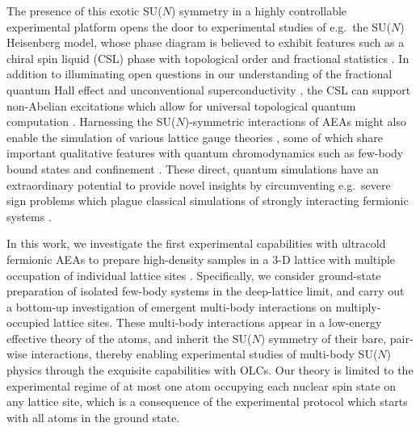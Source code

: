 \documentclass[preprint,showkeys,nofootinbib]{revtex4-1}
\newcommand{\1}{\mathds{1}}
\begin{document}
The presence of this exotic SU($N$) symmetry in a highly controllable
experimental platform opens the door to experimental studies of
e.g.~the SU($N$) Heisenberg model, whose phase diagram is believed to
exhibit features such as a chiral spin liquid (CSL) phase with
topological order and fractional statistics \cite{hermele2009mott,
  hermele2011topological, chen2016syntheticgaugefield}.  In addition
to illuminating open questions in our understanding of the fractional
quantum Hall effect and unconventional superconductivity
\cite{lee2006doping, lee2008high, gong2014emergent}, the CSL can
support non-Abelian excitations which allow for universal topological
quantum computation \cite{freedman2004class, hermele2011topological}.
Harnessing the SU($N$)-symmetric interactions of AEAs might also
enable the simulation of various lattice gauge theories
\cite{wieseu.-j.2013ultracold, zohar2016quantum}, some of which share
important qualitative features with quantum chromodynamics such as
few-body bound states and confinement \cite{banerjee2013atomic,
  rico2018nuclear}.  These direct, quantum simulations have an
extraordinary potential to provide novel insights by circumventing
e.g.~severe sign problems which plague classical simulations of
strongly interacting fermionic systems \cite{wieseu.-j.2013ultracold,
  wu2003exact}.

In this work, we investigate the first experimental capabilities with
ultracold fermionic AEAs to prepare high-density samples in a 3-D
lattice with multiple occupation of individual lattice sites
\cite{goban2018emergence}.  Specifically, we consider ground-state
preparation of isolated few-body systems in the deep-lattice limit,
and carry out a bottom-up investigation of emergent multi-body
interactions on multiply-occupied lattice sites.  These multi-body
interactions appear in a low-energy effective theory of the atoms, and
inherit the SU($N$) symmetry of their bare, pair-wise interactions,
thereby enabling experimental studies of multi-body SU($N$) physics
through the exquisite capabilities with OLCs.  Our theory is limited
to the experimental regime of at most one atom occupying each nuclear
spin state on any lattice site, which is a consequence of the
experimental protocol which starts with all atoms in the ground state.
\end{document}
